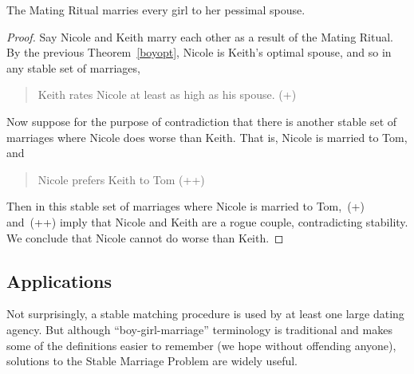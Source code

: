 \begin{theorem}
The Mating Ritual marries every girl to her pessimal spouse.
\end{theorem}

\begin{proof}
Say Nicole and Keith marry each other as a result of the Mating Ritual.
By the previous Theorem~\ref{boyopt}, Nicole is Keith's optimal spouse,
and so in any stable set of marriages,
\begin{quote}
Keith rates Nicole at least as high as his spouse. (+)
\end{quote}

Now suppose for the purpose of contradiction that there is another stable
set of marriages where Nicole does worse than Keith.  That is, Nicole is
married to Tom, and
\begin{quote}
Nicole prefers Keith to Tom (++)
\end{quote}
Then in this stable set of marriages where Nicole is married to Tom,~(+)
and~(++) imply that Nicole and Keith are a rogue couple, contradicting
stability.  We conclude that Nicole cannot do worse than Keith.
\end{proof}

\begin{problems}
\practiceproblems


\homeworkproblems





\end{problems}


\subsection{Applications}

Not surprisingly, a stable matching procedure is used by at least one
large dating agency.  But although ``boy-girl-marriage'' terminology is
traditional and makes some of the definitions easier to remember (we hope
without offending anyone), solutions to the Stable Marriage Problem are
widely useful.

